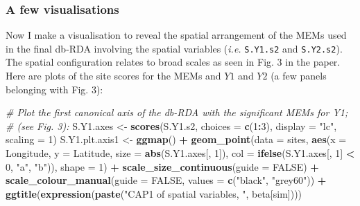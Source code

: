 \documentclass[10pt,A4,]{article}
\newenvironment{Shaded}{\begin{snugshade}}{\end{snugshade}}
\newcommand{\KeywordTok}[1]{\textcolor[rgb]{0.13,0.29,0.53}{\textbf{#1}}}
\newcommand{\DataTypeTok}[1]{\textcolor[rgb]{0.13,0.29,0.53}{#1}}
\newcommand{\DecValTok}[1]{\textcolor[rgb]{0.00,0.00,0.81}{#1}}
\newcommand{\StringTok}[1]{\textcolor[rgb]{0.31,0.60,0.02}{#1}}
\newcommand{\CommentTok}[1]{\textcolor[rgb]{0.56,0.35,0.01}{\textit{#1}}}
\newcommand{\OtherTok}[1]{\textcolor[rgb]{0.56,0.35,0.01}{#1}}
\newcommand{\OperatorTok}[1]{\textcolor[rgb]{0.81,0.36,0.00}{\textbf{#1}}}
\newcommand{\NormalTok}[1]{#1}
\begin{document}
\subsubsection*{A few visualisations}

Now I make a visualisation to reveal the spatial arrangement of the MEMs
used in the final db-RDA involving the spatial variables (\emph{i.e.}
\texttt{S.Y1.s2} and \texttt{S.Y2.s2}). The spatial configuration
relates to broad scales as seen in Fig. 3 in the paper. Here are plots
of the site scores for the MEMs and \(Y1\) and \(Y2\) (a few panels
belonging with Fig. 3):

\begin{Shaded}
\begin{Highlighting}[]
\CommentTok{# Plot the first canonical axis of the db-RDA with the significant MEMs for Y1;}
\CommentTok{# (see Fig. 3):}
\NormalTok{S.Y1.axes <-}\StringTok{ }\KeywordTok{scores}\NormalTok{(S.Y1.s2, }\DataTypeTok{choices =} \KeywordTok{c}\NormalTok{(}\DecValTok{1}\OperatorTok{:}\DecValTok{3}\NormalTok{), }\DataTypeTok{display =} \StringTok{"lc"}\NormalTok{, }\DataTypeTok{scaling =} \DecValTok{1}\NormalTok{)}
\NormalTok{S.Y1.plt.axis1 <-}\StringTok{ }\KeywordTok{ggmap}\NormalTok{() }\OperatorTok{+}
\StringTok{  }\KeywordTok{geom_point}\NormalTok{(}\DataTypeTok{data =}\NormalTok{ sites, }\KeywordTok{aes}\NormalTok{(}\DataTypeTok{x =}\NormalTok{ Longitude, }\DataTypeTok{y =}\NormalTok{ Latitude,}
                               \DataTypeTok{size =} \KeywordTok{abs}\NormalTok{(S.Y1.axes[, }\DecValTok{1}\NormalTok{]),}
                               \DataTypeTok{col =} \KeywordTok{ifelse}\NormalTok{(S.Y1.axes[, }\DecValTok{1}\NormalTok{] }\OperatorTok{<}\StringTok{ }\DecValTok{0}\NormalTok{, }\StringTok{"a"}\NormalTok{, }\StringTok{"b"}\NormalTok{)), }\DataTypeTok{shape =} \DecValTok{1}\NormalTok{) }\OperatorTok{+}
\StringTok{  }\KeywordTok{scale_size_continuous}\NormalTok{(}\DataTypeTok{guide =} \OtherTok{FALSE}\NormalTok{) }\OperatorTok{+}
\StringTok{  }\KeywordTok{scale_colour_manual}\NormalTok{(}\DataTypeTok{guide =} \OtherTok{FALSE}\NormalTok{, }\DataTypeTok{values =} \KeywordTok{c}\NormalTok{(}\StringTok{"black"}\NormalTok{, }\StringTok{"grey60"}\NormalTok{)) }\OperatorTok{+}
\StringTok{  }\KeywordTok{ggtitle}\NormalTok{(}\KeywordTok{expression}\NormalTok{(}\KeywordTok{paste}\NormalTok{(}\StringTok{"CAP1 of spatial variables, "}\NormalTok{, beta[sim])))}


\end{Highlighting}
\end{Shaded}
\end{document}
